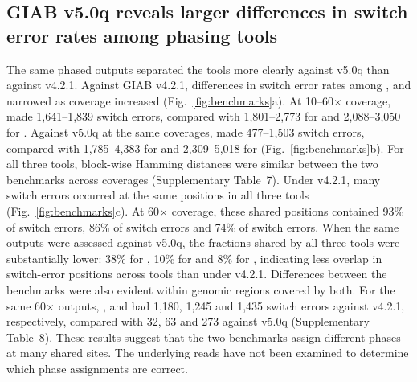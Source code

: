 
\subsection*{GIAB v5.0q reveals larger differences in switch error rates among phasing tools}
The same phased outputs separated the tools more clearly against v5.0q than against v4.2.1. Against GIAB v4.2.1, differences in switch error rates among \toolname, \whatshap and \hapcut narrowed as coverage increased (Fig.~\ref{fig:benchmarks}a). At 10--60$\times$ coverage, \toolname made 1,641--1,839 switch errors, compared with 1,801--2,773 for \whatshap and 2,088--3,050 for \hapcut. Against v5.0q at the same coverages, \toolname made 477--1,503 switch errors, compared with 1,785--4,383 for \whatshap and 2,309--5,018 for \hapcut (Fig.~\ref{fig:benchmarks}b). For all three tools, block-wise Hamming distances were similar between the two benchmarks across coverages (Supplementary Table~7). Under v4.2.1, many switch errors occurred at the same positions in all three tools (Fig.~\ref{fig:benchmarks}c). At 60$\times$ coverage, these shared positions contained 93\% of \toolname switch errors, 86\% of \whatshap switch errors and 74\% of \hapcut switch errors. When the same outputs were assessed against v5.0q, the fractions shared by all three tools were substantially lower: 38\% for \toolname, 10\% for \whatshap and 8\% for \hapcut, indicating less overlap in switch-error positions across tools than under v4.2.1. Differences between the benchmarks were also evident within genomic regions covered by both. For the same 60$\times$ outputs, \toolname, \whatshap and \hapcut had 1,180, 1,245 and 1,435 switch errors against v4.2.1, respectively, compared with 32, 63 and 273 against v5.0q (Supplementary Table~8). These results suggest that the two benchmarks assign different phases at many shared sites. The underlying reads have not been examined to determine which phase assignments are correct.

